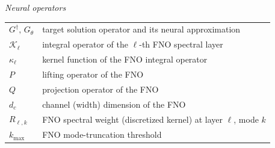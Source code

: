 \vspace{0.5cm}
\noindent\textit{Neural operators}\\[2pt]
\noindent
\begin{tabular}{@{}p{2.6cm}p{12cm}@{}}
    $G^\dagger,\,G_\theta$ & target solution operator and its neural approximation \\[2pt]
    $\mathcal{K}_{\ell}$   & integral operator of the $\ell$-th FNO spectral layer \\[2pt]
    $\kappa_{\ell}$        & kernel function of the FNO integral operator \\[2pt]
    $P$                    & lifting operator of the FNO \\[2pt]
    $Q$                    & projection operator of the FNO \\[2pt]
    $d_c$                  & channel (width) dimension of the FNO \\[2pt]
    $R_{\ell,k}$           & FNO spectral weight (discretized kernel) at layer $\ell$, mode $k$ \\[2pt]
    $k_{\max}$             & FNO mode-truncation threshold \\
\end{tabular}

\pagebreak


 









\printbibliography

